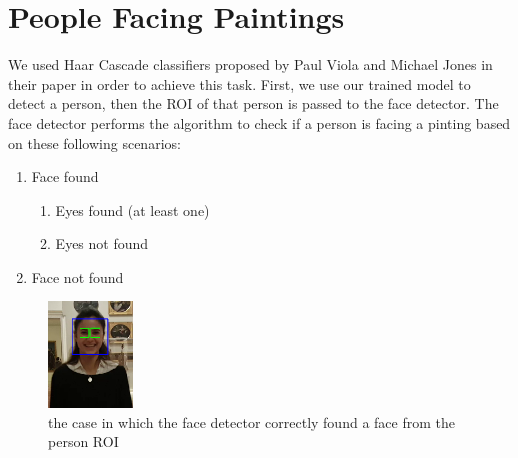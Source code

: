 \section{People Facing Paintings}
We used Haar Cascade classifiers proposed by Paul Viola and Michael Jones in their paper \cite{haar_cascade} in order to achieve this task. First, we use our trained model to detect a person, then the ROI of that person is passed to the face detector. The face detector performs the algorithm to check if a person is facing a pinting based on these following scenarios:
\begin{enumerate}[label=\alph*)]
	\item Face found
    \begin{enumerate}[label=(\roman*)]
        \item \label{Eyes found} Eyes found (at least one)
        \item \label{Eyes not found} Eyes not found 
    \end{enumerate}
	\item \label{Face not found} Face not found
\end{enumerate}

\begin{figure}
    \centering
        \includegraphics[width=0.2\textwidth]{pictures/face_detection/face_det2}
    \caption{the case in which the face detector correctly found a face from the person ROI}
    \label{fig:Eyes}
\end{figure}

